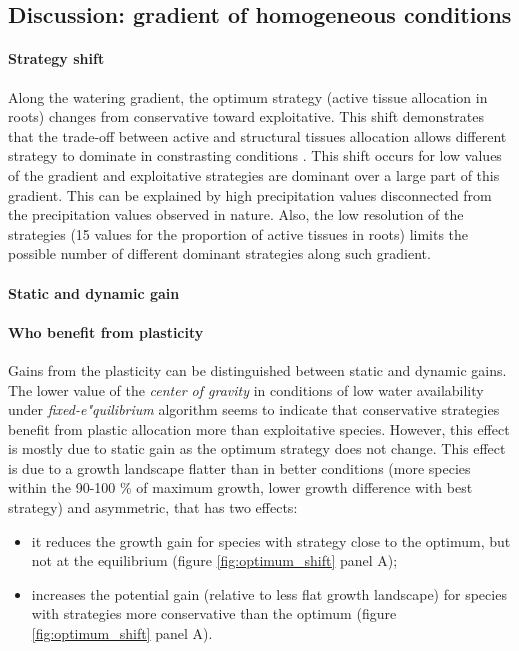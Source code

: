 \subsection{Discussion: gradient of homogeneous conditions}

\paragraph{Strategy shift}
Along the watering gradient, the optimum strategy (active tissue allocation in roots) changes from conservative toward exploitative. This shift demonstrates that the trade-off between active and structural tissues allocation allows different strategy to dominate in constrasting conditions \parencite{}. This shift occurs for low values of the gradient and exploitative strategies are dominant over a large part of this gradient. This can be explained by high precipitation values disconnected from the precipitation values observed in nature. Also, the low resolution of the strategies (15 values for the proportion of active tissues in roots) limits the possible number of different dominant strategies along such gradient. 

\paragraph{Static and dynamic gain}
\paragraph{Who benefit from plasticity}

Gains from the plasticity can be distinguished between static and dynamic gains. The lower value of the \textit{center of gravity} in conditions of low water availability under \textit{fixed-e"quilibrium} algorithm seems to indicate that conservative strategies benefit from plastic allocation more than exploitative species. However, this effect is mostly due to static gain as the optimum strategy does not change. This 
effect is due to a growth landscape flatter than in better conditions (more species within the 90-100 \% of maximum growth, lower growth difference with best strategy) and asymmetric, that has two effects:
\begin{itemize}
\item it reduces the growth gain for species with strategy close to the optimum, but not at the equilibrium (figure \ref{fig:optimum_shift} panel A);
\item increases the potential gain (relative to less flat growth landscape) for species with strategies more conservative than the optimum (figure \ref{fig:optimum_shift} panel A).
\end{itemize}



